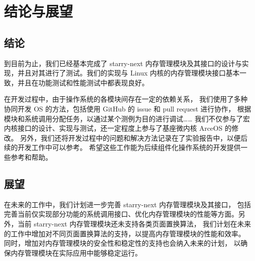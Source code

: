 
\chapter{结论与展望}

\section{结论}

到目前为止，我们已经基本完成了 starry-next 内存管理模块及其接口的设计与实现，并且对其进行了测试。我们的实现与 Linux 内核的内存管理模块接口基本一致，并且在功能测试和性能测试中都表现良好。

在开发过程中，由于操作系统的各模块间存在一定的依赖关系，
我们使用了多种协同开发 OS 的方法，包括使用 GitHub 的 issue 和 pull request 进行协作，
根据模块和系统调用分配任务，以通过某个测例为目的进行调试……
我们不仅参与了宏内核接口的设计、实现与测试，还一定程度上参与了基座微内核 ArceOS 的修改。
另外，我们还将开发过程中的问题和解决方法记录在了实验报告中，以便后续的开发工作中可以参考。
希望这些工作能为后续组件化操作系统的开发提供一些参考和帮助。

\section{展望}

在未来的工作中，我们计划进一步完善 starry-next 内存管理模块及其接口，
包括完善当前仅实现部分功能的系统调用接口、优化内存管理模块的性能等方面。另外，当前 starry-next 内存管理模块还未支持各类页面置换算法，
我们计划在未来的工作中增加对不同页面置换算法的支持，以提高内存管理模块的性能和效率。
同时，增加对内存管理模块的安全性和稳定性的支持也会纳入未来的计划，
以确保内存管理模块在实际应用中能够稳定运行。